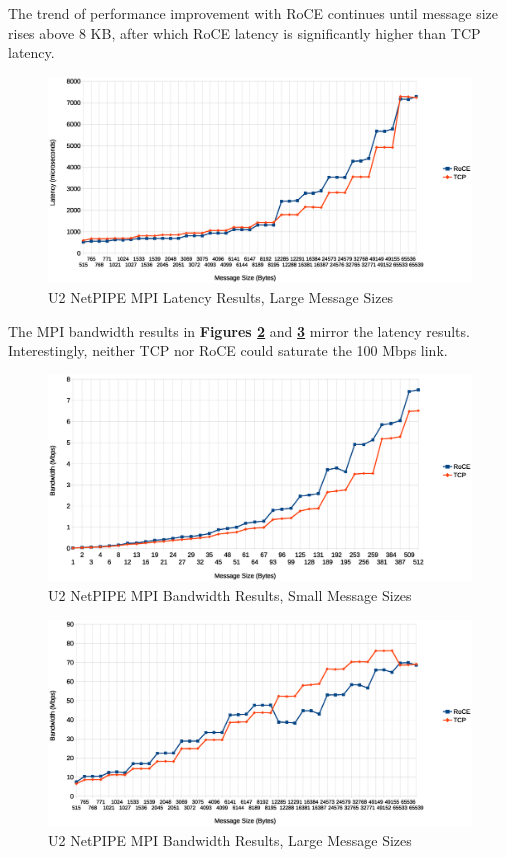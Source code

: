 \documentclass[11pt]{book}
\begin{document}
The trend of performance improvement with RoCE continues until message size
rises above 8 KB, after which RoCE latency is significantly higher than TCP
latency.

\begin{figure}[h]
\includegraphics[width=\textwidth]{netpipe_lat_large}
\caption{U2 NetPIPE MPI Latency Results, Large Message Sizes}
\label{npmpi-hlat}
\end{figure}

The MPI bandwidth results in \textbf{Figures \ref{npmpi-lbw}} and
\textbf{\ref{npmpi-hbw}} mirror the latency results. Interestingly, neither TCP
nor RoCE could saturate the 100 Mbps link.

\begin{figure}[h]
\includegraphics[width=\textwidth]{netpipe_bw_small}
\caption{U2 NetPIPE MPI Bandwidth Results, Small Message Sizes}
\label{npmpi-lbw}
\end{figure}



\begin{figure}[h]
\includegraphics[width=\textwidth]{netpipe_bw_large}
\caption{U2 NetPIPE MPI Bandwidth Results, Large Message Sizes}
\label{npmpi-hbw}
\end{figure}
\end{document}
